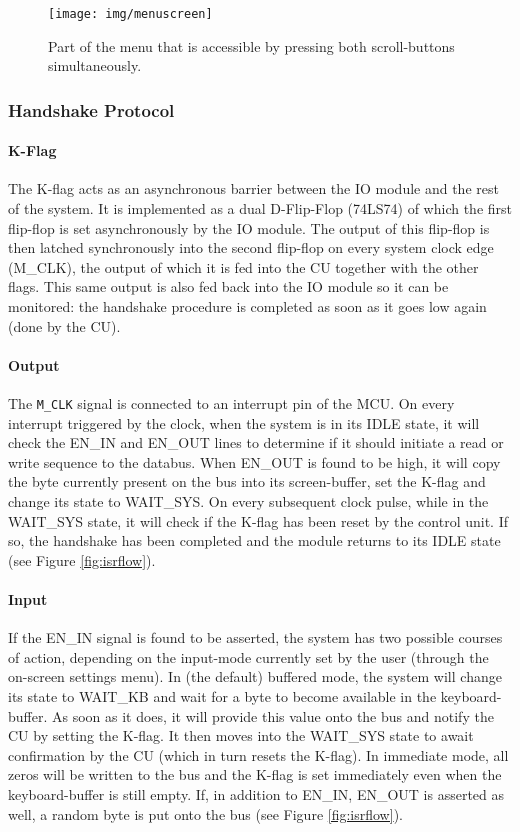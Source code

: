\begin{figure}[h]
  \centering
  \texttt{[image: img/menuscreen]}
  \caption{Part of the menu that is accessible by pressing both scroll-buttons simultaneously.}
  \label{fig:menuscreen}
\end{figure}


\subsubsection{Handshake Protocol}
\paragraph{K-Flag} The K-flag acts as an asynchronous barrier between the IO module and the rest of the system. It is implemented as a dual D-Flip-Flop (74LS74) of which the first flip-flop is set asynchronously by the IO module. The output of this flip-flop is then latched synchronously into the second flip-flop on every system clock edge (M\_CLK), the output of which it is fed into the CU together with the other flags. This same output is also fed back into the IO module so it can be monitored: the handshake procedure is completed as soon as it goes low again (done by the CU). 

\paragraph{Output} The \texttt{M\_CLK} signal is connected to an interrupt pin of the MCU. On every interrupt triggered by the clock, when the system is in its IDLE state, it will check the EN\_IN and EN\_OUT lines to determine if it should initiate a read or write sequence to the databus. When EN\_OUT is found to be high, it will copy the byte currently present on the bus into its screen-buffer, set the K-flag and change its state to WAIT\_SYS. On every subsequent clock pulse, while in the WAIT\_SYS state, it will check if the K-flag has been reset by the control unit. If so, the handshake has been completed and the module returns to its IDLE state (see Figure \ref{fig:isrflow}).

\paragraph{Input} If the EN\_IN signal is found to be asserted, the system has two possible courses of action, depending on the input-mode currently set by the user (through the on-screen settings menu). In (the default) buffered mode, the system will change its state to WAIT\_KB and wait for a byte to become available in the keyboard-buffer. As soon as it does, it will provide this value onto the bus and notify the CU by setting the K-flag. It then moves into the WAIT\_SYS state to await confirmation by the CU (which in turn resets the K-flag). In immediate mode, all zeros will be written to the bus and the K-flag is set immediately even when the keyboard-buffer is still empty. If, in addition to EN\_IN, EN\_OUT is asserted as well, a random byte is put onto the bus (see Figure \ref{fig:isrflow}).

